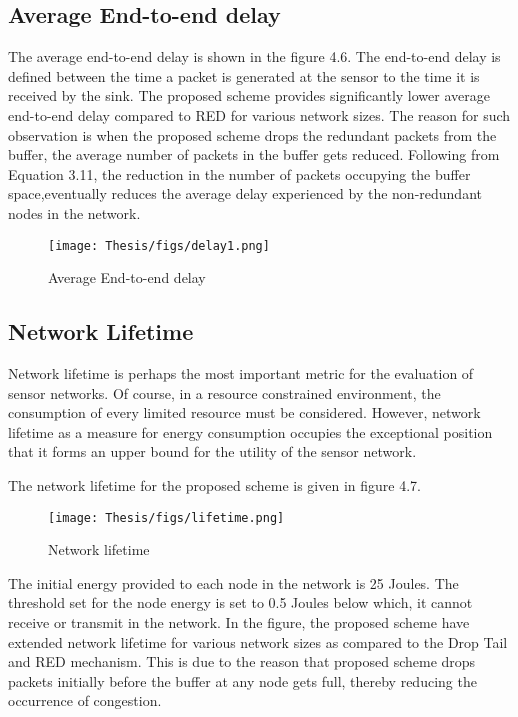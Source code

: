 \subsection{Average End-to-end delay}
\vspace{0.5cm}
The average end-to-end delay is shown in the figure 4.6. The end-to-end delay is defined between the time a packet is generated at the sensor to the time it is received by the sink. The proposed scheme provides significantly lower average end-to-end delay compared to RED for various network sizes. The reason for such observation is when the proposed scheme drops the redundant packets from the buffer, the average number of packets in the buffer gets reduced. Following from Equation 3.11, the reduction in the number of packets occupying the buffer space,eventually reduces the average delay experienced by the non-redundant nodes in the network.    
\begin{figure}[h!]
    \centering
    \texttt{[image: Thesis/figs/delay1.png]}
    \caption{Average End-to-end delay}
    \label{fig:my_label}
\end{figure}
\subsection{Network Lifetime}
Network lifetime is perhaps the most important metric for the evaluation of sensor networks. Of course, in a resource constrained environment, the consumption of every limited resource must be considered. However, network lifetime as a measure for energy consumption occupies the exceptional position that it forms an upper bound for the utility of the sensor network. 
\par
The network lifetime for the proposed scheme is given in figure 4.7. 
\begin{figure}[h!]
    \centering
    \texttt{[image: Thesis/figs/lifetime.png]}
    \caption{Network lifetime}
    \label{fig:my_label}
\end{figure}
\par
The initial energy provided to each node in the network is 25 Joules. The threshold set for the node energy is set to 0.5 Joules below which, it cannot receive or transmit in the network. In the figure, the proposed scheme have extended network lifetime for various network sizes as compared to the Drop Tail and RED mechanism. This is due to the reason that proposed scheme drops packets initially before the buffer at any node gets full, thereby reducing the occurrence of congestion. 
